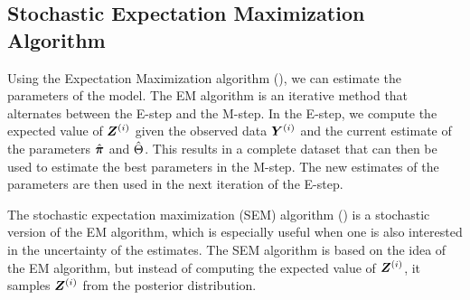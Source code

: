 \subsection{Stochastic Expectation Maximization Algorithm}
\label{SEM}

Using the Expectation Maximization algorithm (\cite
{dempsterMaximumLikelihoodIncomplete1977}), we can estimate the parameters of
the model. The EM algorithm is an iterative method that alternates between the
E-step and the M-step. In the E-step, we compute the expected value of
$\bm{Z}^{(i)}$ given the observed data $\bm{Y}^{(i)}$ and the current estimate of the
parameters $\hat{\bm{\pi}}$ and $\hat{\Theta}$. This results in a complete dataset that
can then be used to estimate the best parameters in the M-step. The new estimates
of the parameters are then used in the next iteration of the E-step.

The stochastic expectation maximization (SEM) algorithm
(\cite{celeuxStochasticVersionsEm1996}) is a stochastic version of the EM
algorithm, which is especially useful when one is also interested in the
uncertainty of the estimates. The SEM algorithm is based on the idea of the EM
algorithm, but instead of computing the expected value of $\bm{Z}^{(i)}$, it
samples $\bm{Z}^{(i)}$ from the posterior distribution.\bigskip

